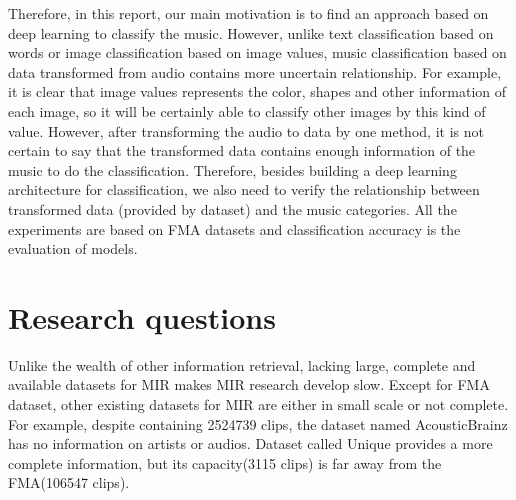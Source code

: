 \documentclass{article}
\begin{document}
Therefore, in this report, our main motivation is to find an approach based on deep learning to classify the music. However, unlike text classification based on words or image classification based on image values, music classification based on data transformed from audio contains more uncertain relationship. For example, it is clear that image values represents the color, shapes and other information of each image, so it will be certainly able to classify other images by this kind of value. However, after transforming the audio to data by one method, it is not certain to say that the transformed data contains enough information of the music to do the classification. Therefore, besides building a deep learning architecture for classification, we also need to verify the relationship between transformed data (provided by dataset) and the music categories. All the experiments are based on FMA datasets and classification accuracy is the evaluation of models.\citep{fma}


\section{Research questions} 
Unlike the wealth of other information retrieval, lacking large, complete and available datasets for MIR makes MIR research develop slow. Except for FMA dataset, other existing datasets for MIR are either in small scale or not complete. 
For example, despite containing 2524739 clips, the dataset named AcousticBrainz has no information on artists or audios. Dataset called Unique provides a more complete information, but its capacity(3115 clips) is far away from the FMA(106547 clips). \cite{fma}
\end{document}
